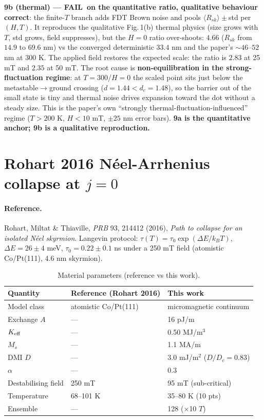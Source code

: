 \documentclass[11pt]{article}
\newcommand{\FAIL}{\textcolor{red!75!black}{\textbf{FAIL}}}
\begin{document}
\noindent\textbf{9b (thermal) --- \FAIL\ on the quantitative ratio,
qualitative behaviour correct}: the finite-$T$ branch adds FDT
Brown noise and pools $\langle R_{sk}\rangle\pm$std per $(H,T)$. It
reproduces the qualitative Fig.\,1(b) thermal physics (size grows
with $T$, std grows, field suppresses), but the $H{=}0$ ratio
over-shoots: $4.66$ ($R_{sk}$ from $14.9$ to $69.6$ nm) vs the
converged deterministic $33.4$ nm and the paper's ${\sim}46$--$52$
nm at 300 K. The applied field restores the expected scale: the
ratio is $2.83$ at 25 mT and $2.35$ at 50 mT. The root cause is
\textbf{non-equilibration in the strong-fluctuation regime}: at
$T{=}300$/$H{=}0$ the scaled point sits just below the
metastable$\to$ground crossing ($d{=}1.44<d_c{=}1.48$), so the
barrier out of the small state is tiny and thermal noise drives
expansion toward the dot without a steady size. This is the paper's
own ``strongly thermal-fluctuation-influenced'' regime ($T{>}200$ K,
$H{<}10$ mT, $\pm25$ nm error bars). \textbf{9a is the quantitative anchor; 9b
is a qualitative reproduction.}

\clearpage
\section{Rohart 2016 N\'eel-Arrhenius collapse at $j=0$}
\label{sec:arrhenius}

\paragraph{Reference.} Rohart, Miltat \& Thiaville, \emph{PRB} 93,
214412 (2016), \emph{Path to collapse for an isolated N\'eel
skyrmion}. Langevin protocol: $\tau(T)=\tau_0\exp(\Delta E/k_BT)$,
$\Delta E=26\pm4$ meV, $\tau_0=0.22\pm0.1$ ns under a 250 mT field
(atomistic Co/Pt(111), 4.6 nm skyrmion).

\begin{table}[htbp]
\centering
\caption{Material parameters (reference vs this work).}
\begin{tabular}{@{}lll@{}}
\toprule
Quantity & Reference (Rohart 2016) & This work \\
\midrule
Model class & atomistic Co/Pt(111) & micromagnetic continuum \\
Exchange $A$    & ---            & 16 pJ/m \\
$K_{\rm eff}$   & ---            & 0.50 MJ/m$^3$ \\
$M_s$           & ---            & 1.1 MA/m \\
DMI $D$         & ---            & 3.0 mJ/m$^2$ ($D/D_c{=}0.83$)\\
$\alpha$        & ---            & 0.3 \\
Destabilising field & 250 mT     & 95 mT (sub-critical) \\
Temperature     & 68--101 K      & 35--80 K (10 pts) \\
Ensemble        & ---            & 128 ($\times$10 $T$) \\
\bottomrule
\end{tabular}
\end{table}
\end{document}
